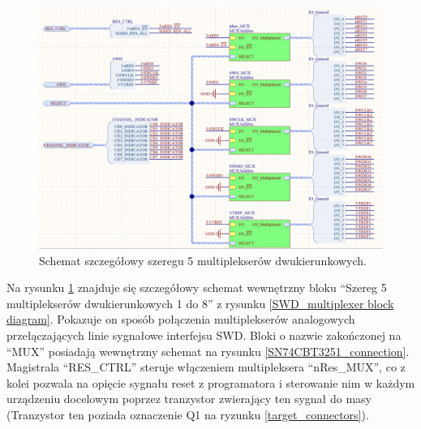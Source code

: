  \begin{figure}[H]
    \centering
    \includegraphics[width=0.8\paperwidth]{images/mux_matrix.png}
    \caption{{Schemat szczegółowy szeregu 5 multiplekserów dwukierunkowych.}}
    \label{mux_matrix diagram}
\end{figure}

Na rysunku \ref{mux_matrix diagram} znajduje się szczegółowy schemat wewnętrzny bloku \enquote{Szereg 5 
multiplekserów 
dwukierunkowych 1 do 8} z rysunku  \ref{SWD_multiplexer block diagram}.
Pokazuje on sposób połączenia multiplekserów analogowych przełączających linie sygnałowe interfejsu SWD. Bloki o nazwie zakończonej na \enquote{MUX} posiadają wewnętrzny schemat na rysunku \ref{SN74CBT3251_connection}.
Magistrala \enquote{RES\_CTRL} steruje włączeniem multipleksera \enquote{nRes\_MUX}, co z kolei pozwala na opięcie sygnału reset z programatora i sterowanie nim w każdym urządzeniu docelowym poprzez tranzystor zwierający ten sygnał do masy (Tranzystor ten poziada oznaczenie Q1 na ryzunku \ref{target_connectors}).



